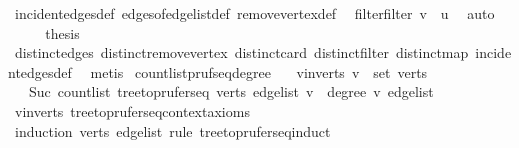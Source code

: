 \begin{isabellebody}
\ incident{\isacharunderscore}{\kern0pt}edges{\isacharunderscore}{\kern0pt}def\ edges{\isacharunderscore}{\kern0pt}of{\isacharunderscore}{\kern0pt}edge{\isacharunderscore}{\kern0pt}list{\isacharunderscore}{\kern0pt}def\ remove{\isacharunderscore}{\kern0pt}vertex{\isacharunderscore}{\kern0pt}def\ \isamarkupfalse%
\ filter{\isacharunderscore}{\kern0pt}filter\ {\isacartoucheopen}v\ {\isasymnoteq}\ u{\isacartoucheclose}\ \isamarkupfalse%
\ auto\isanewline
\ \ \isamarkupfalse%
\ \isamarkupfalse%
\ {\isacharquery}{\kern0pt}thesis\ \isamarkupfalse%
\ distinct{\isacharunderscore}{\kern0pt}edges\ distinct{\isacharunderscore}{\kern0pt}remove{\isacharunderscore}{\kern0pt}vertex\ distinct{\isacharunderscore}{\kern0pt}card\ distinct{\isacharunderscore}{\kern0pt}filter\ distinct{\isacharunderscore}{\kern0pt}map\ incident{\isacharunderscore}{\kern0pt}edges{\isacharunderscore}{\kern0pt}def\ \isamarkupfalse%
\ metis\isanewline
{}\isamarkupfalse%
%
\endisatagproof
{\isafoldproof}%
%
\isadelimproof
\isanewline
%
\endisadelimproof
\isanewline
{}\isamarkupfalse%
\ count{\isacharunderscore}{\kern0pt}list{\isacharunderscore}{\kern0pt}pruf{\isacharunderscore}{\kern0pt}seq{\isacharunderscore}{\kern0pt}degree{\isacharcolon}{\kern0pt}\isanewline
\ \ \ v{\isacharunderscore}{\kern0pt}in{\isacharunderscore}{\kern0pt}verts{\isacharcolon}{\kern0pt}\ {\isachardoublequoteopen}v\ {\isasymin}\ set\ verts{\isachardoublequoteclose}\isanewline
\ \ \ {\isachardoublequoteopen}Suc\ {\isacharparenleft}{\kern0pt}count{\isacharunderscore}{\kern0pt}list\ {\isacharparenleft}{\kern0pt}tree{\isacharunderscore}{\kern0pt}to{\isacharunderscore}{\kern0pt}prufer{\isacharunderscore}{\kern0pt}seq\ verts\ edge{\isacharunderscore}{\kern0pt}list{\isacharparenright}{\kern0pt}\ v{\isacharparenright}{\kern0pt}\ {\isacharequal}{\kern0pt}\ degree\ v\ edge{\isacharunderscore}{\kern0pt}list{\isachardoublequoteclose}\isanewline
%
\isadelimproof
\ \ %
\endisadelimproof
%
\isatagproof
{}\isamarkupfalse%
\ v{\isacharunderscore}{\kern0pt}in{\isacharunderscore}{\kern0pt}verts\ tree{\isacharunderscore}{\kern0pt}to{\isacharunderscore}{\kern0pt}prufer{\isacharunderscore}{\kern0pt}seq{\isacharunderscore}{\kern0pt}context{\isacharunderscore}{\kern0pt}axioms\isanewline
{}\isamarkupfalse%
\ {\isacharparenleft}{\kern0pt}induction\ verts\ edge{\isacharunderscore}{\kern0pt}list\ rule{\isacharcolon}{\kern0pt}\ tree{\isacharunderscore}{\kern0pt}to{\isacharunderscore}{\kern0pt}prufer{\isacharunderscore}{\kern0pt}seq{\isachardot}{\kern0pt}induct{\isacharparenright}{\kern0pt}\isanewline

\end{isabellebody}
